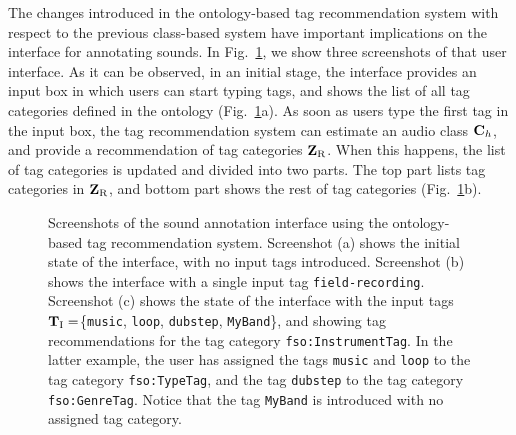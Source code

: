 The changes introduced in the ontology-based tag recommendation system with respect to the previous class-based system have important implications on the interface for annotating sounds. In Fig.~\ref{ontology:fig:interface}, we show three screenshots of that user interface.
As it can be observed, in an initial stage, the interface provides an input box in which users can start typing tags, and shows the list of all tag categories defined in the ontology (Fig.~\ref{ontology:fig:interface}a).
As soon as users type the first tag in the input box, the tag recommendation system can estimate an audio class $\mathbf{C}_{h}$, and provide a recommendation of tag categories $\mathbf{Z}_\text{R}$. When this happens, the list of tag categories is updated and divided into two parts. The top part lists tag categories in $\mathbf{Z}_\text{R}$, and bottom part shows the rest of tag categories (Fig.~\ref{ontology:fig:interface}b).

\begin{figure}
  \centering
  \centering
  \caption[Screenshots of the sound annotation interface]{Screenshots of the sound annotation interface using the ontology-based tag recommendation system. 
  Screenshot (a) shows the initial state of the interface, with no input tags introduced. 
  Screenshot (b) shows the interface with a single input tag \texttt{field-recording}.
  Screenshot (c) shows the state of the interface with the input tags $\mathbf{T}_{\text{I}}=$\{\texttt{music}, \texttt{loop}, \texttt{dubstep}, \texttt{MyBand}\}, and showing tag recommendations for the tag category \texttt{fso:InstrumentTag}. In the latter example, the user has assigned the tags \texttt{music} and \texttt{loop} to the tag category \texttt{fso:TypeTag}, and the tag \texttt{dubstep} to the tag category \texttt{fso:GenreTag}. Notice that the tag \texttt{MyBand} is introduced with no assigned tag category.}
  \label{ontology:fig:interface}
\end{figure}

